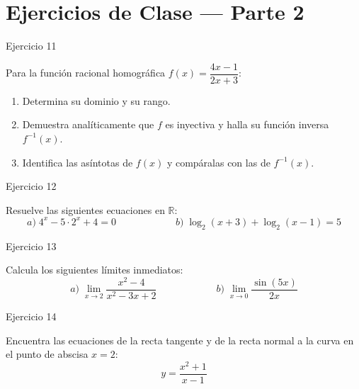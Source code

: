 \documentclass[aspectratio=169]{beamer}
\begin{document}
\section{Ejercicios de Clase — Parte 2}

\begin{frame}{Ejercicio 11}
  \begin{mwejercicio}
    Para la función racional homográfica $f(x) = \dfrac{4x - 1}{2x + 3}$:
    \begin{enumerate}
      \item Determina su dominio y su rango.
      \item Demuestra analíticamente que $f$ es inyectiva y halla su función inversa $f^{-1}(x)$.
      \item Identifica las asíntotas de $f(x)$ y compáralas con las de $f^{-1}(x)$.
    \end{enumerate}
  \end{mwejercicio}
  \vspace{2.5cm}
\end{frame}
\begin{frame}{Ejercicio 12}
  \begin{mwejercicio}
    Resuelve las siguientes ecuaciones en $\mathbb{R}$:
    $$a)\; 4^x - 5 \cdot 2^x + 4 = 0 \qquad\qquad\qquad b)\; \log_2(x + 3) + \log_2(x - 1) = 5$$
  \end{mwejercicio}
  \vspace{3.5cm}
\end{frame}
\begin{frame}{Ejercicio 13}
  \begin{mwejercicio}
    Calcula los siguientes límites inmediatos:
    $$a)\; \lim_{x \to 2} \frac{x^2 - 4}{x^2 - 3x + 2} \qquad\qquad\qquad b)\; \lim_{x \to 0} \frac{\sin(5x)}{2x}$$
  \end{mwejercicio}
  \vspace{3.5cm}
\end{frame}
\begin{frame}{Ejercicio 14}
  \begin{mwejercicio}
    Encuentra las ecuaciones de la recta tangente y de la recta normal a la curva en el punto de abscisa $x = 2$:
    $$y = \frac{x^2 + 1}{x - 1}$$
  \end{mwejercicio}
  \vspace{3.5cm}
\end{frame}
\end{document}
